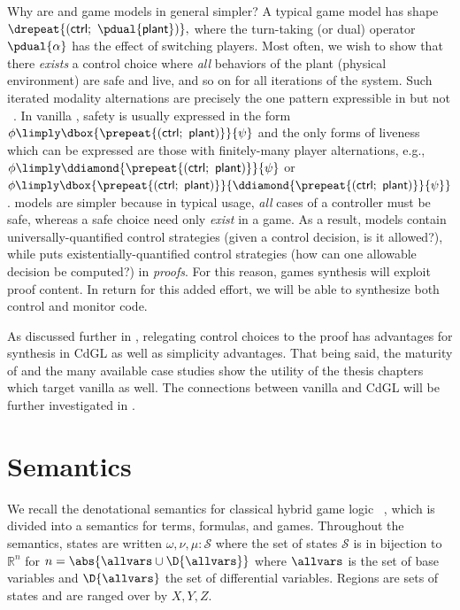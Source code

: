 \documentclass[12pt]{cmuthesis}
\theoremstyle{definition}
\theoremstyle{remark}
\newcommand{\ctrl}{\textsf{ctrl}\xspace}
\newcommand{\plant}{\textsf{plant}\xspace}
\newcommand{\rref}[2][]{\prettyref{#2}}
\newcommand{\allstate}{\mathcal{S}}
\newcommand{\CdGL}{\textsf{CdGL}\xspace}
\begin{document}
Why are \rref{ex:driving-game} and game models in general simpler? %
A typical game model has shape $\drepeat{(\ctrl;~\pdual{\plant})},$ where the turn-taking (or dual) operator $\pdual{\alpha}$ has the effect of switching players.
Most often, we wish to show that there \emph{exists} a control choice where \emph{all} behaviors of the plant (physical environment) are safe and live, and so on for all iterations of the system.
Such iterated modality alternations are precisely the one pattern expressible in \dGL but not \dL~\cite{DBLP:journals/tocl/Platzer15}.
In vanilla \dL, safety is usually expressed in the form $\phi \limply \dbox{\prepeat{(\ctrl;~\plant)}}{\psi}$ and the only forms of liveness which can be expressed are those with finitely-many player alternations, e.g.,
$\phi \limply \ddiamond{\prepeat{(\ctrl;~\plant)}}{\psi}$ or $\phi \limply \dbox{\prepeat{(\ctrl;~\plant)}}{\ddiamond{\prepeat{(\ctrl;~\plant)}}{\psi}}$.
\dGL models are simpler because in typical \dL usage, \emph{all} cases of a controller must be safe, whereas a safe choice need only \emph{exist} in a game.
As a result, \dL models contain universally-quantified control strategies (given a control decision, is it allowed?),
while \dGL puts existentially-quantified control strategies (how can one allowable decision be computed?) in \emph{proofs}.
For this reason, games synthesis\rref{ch:proofplex} will exploit proof content.
In return for this added effort, we will be able to synthesize both control and monitor code.

As discussed further in \rref{ch:cdgl}, relegating control choices to the proof has advantages for synthesis in \CdGL as well as simplicity advantages.
That being said, the maturity of \KeYmaeraX and the many available case studies show the utility of the thesis chapters which target vanilla \dL as well.
The connections between vanilla \dL and \CdGL will be further investigated in \rref{ch:cdgl}.

\section{Semantics}
\label{sec:dgl-semantics}
We recall the denotational semantics for classical hybrid game logic \dGL~\cite{DBLP:journals/tocl/Platzer15}, which is divided into a semantics for terms, formulas, and games.
Throughout the semantics, states are written $\omega, \nu, \mu : \allstate$ where the set of states $\allstate$ is in bijection to $\mathbb{R}^n$ for $n = \abs{\allvars \cup \D{\allvars}}$ where $\allvars$ is the set of base variables and $\D{\allvars}$ the set of differential variables.
Regions are sets of states and are ranged over by $X, Y, Z$.
\end{document}
